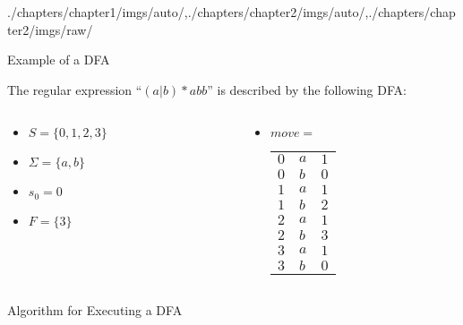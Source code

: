 \begin{graphicspathcontext}{{./chapters/chapter1/imgs/auto/},{./chapters/chapter2/imgs/auto/},{./chapters/chapter2/imgs/raw/}}
\begin{bibunit}[apalike]
\begin{frame}{Example of a DFA}
	\begin{center}
		The regular expression ``$(a|b)*abb$'' is described by the following DFA: \\[.25cm]
	\end{center}
	\begin{columns}
		\begin{column}[t]{.4\linewidth}
			\begin{itemize}
				\item $S = \{0, 1, 2, 3\}$
				\item $\Sigma = \{a, b\}$
				\item $s_0 = 0$
				\item $F = \{3\}$
			\end{itemize}
		\end{column}
		\begin{column}[t]{.6\linewidth}
			\begin{itemize}
				\item $move=$ \smaller\smaller\smaller\begin{tabularx}{.6\linewidth}{|X|X|X|}
					\hline
					\tabularheading\chead{$S$} & \chead{$\Sigma_+$} & \chead{$S'$} \\
					\hline
					$0$ & $a$ & $1$ \\
					$0$ & $b$ & $0$ \\
					$1$ & $a$ & $1$ \\
					$1$ & $b$ & $2$ \\
					$2$ & $a$ & $1$ \\
					$2$ & $b$ & $3$ \\
					$3$ & $a$ & $1$ \\
					$3$ & $b$ & $0$ \\
					\hline
				\end{tabularx}
			\end{itemize}
		\end{column}
	\end{columns}
\end{frame}

\begin{frame}[t,fragile]{Algorithm for Executing a DFA}
	\begin{myalgorithm}
	\BlankLine
	\end{myalgorithm}
\end{frame}


\end{bibunit}
\end{graphicspathcontext}

